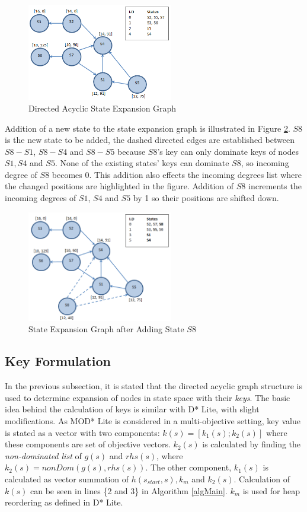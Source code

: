 \documentclass[10pt,journal]{IEEEtran}
\begin{document}
\begin{figure}
\centering
\includegraphics[width=2.5in]{modstarlite/graph1v2}
\caption{Directed Acyclic State Expansion Graph}
\label{fig:graph1}
\end{figure}

Addition of a new state to the state expansion graph is illustrated in Figure \ref{fig:graph2}.  $S8$ is  the new state to be added, the dashed directed edges are established between $S8-S1$, $S8-S4$ and $S8-S5$ because $S8$'s key can only dominate keys of nodes $S1, S4$ and $S5$. None of the existing states' keys can dominate $S8$, so incoming degree of $S8$ becomes 0. This addition also effects the incoming degrees list where the changed positions are highlighted in the figure. Addition of $S8$ increments the incoming degrees of $S1$, $S4$ and $S5$ by 1 so their positions are shifted down.

\begin{figure}
\centering
\includegraphics[width=2.5in]{modstarlite/graph2v2}
\caption{State Expansion Graph after Adding State $S8$}
\label{fig:graph2}
\end{figure}

\subsection{Key Formulation}
In the previous subsection, it is stated that the directed acyclic graph structure is used to determine expansion of nodes in state space with their \textit{keys}. The basic idea behind the calculation of keys is similar with D* Lite, with slight modifications. As MOD* Lite is considered in a multi-objective setting, key value is stated as a vector with two components: $k(s) = [k_{1}(s);k_{2}(s)]$ where these components are set of objective vectors. $k_{2}(s)$ is calculated by finding the \textit{non-dominated list} of $g(s)$ and $rhs(s)$, where $k_{2}(s)= nonDom(g(s), rhs(s))$. The other component, $k_{1}(s)$  is calculated as vector summation of $h(s_{start}, s), k_{m}$ and $k_{2}(s)$. Calculation of $k(s)$ can be seen in lines \{2 and 3\} in Algorithm \ref{algMain}. $k_{m}$ is used for heap reordering as defined in  D* Lite.
\end{document}
